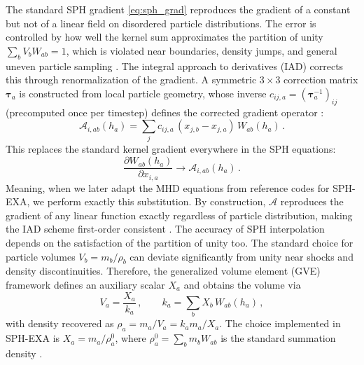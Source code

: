 The standard SPH gradient \eqref{eq:sph_grad} reproduces the gradient of a constant but not of a linear field on disordered particle distributions. The error is controlled by how well the kernel sum approximates the partition of unity $\sum_b V_b W_{ab} = 1$, which is violated near boundaries, density jumps, and general uneven particle sampling \cite{Cabezon2012}. The integral approach to derivatives (IAD) corrects this through renormalization of the gradient. A symmetric $3\times 3$ correction matrix $\boldsymbol{\tau}_a$ is constructed from local particle geometry, whose inverse $c_{ij,a} = (\boldsymbol{\tau}_a^{-1})_{ij}$ (precomputed once per timestep) defines the corrected gradient operator \cite{Cabezon2012, Cabezon2017}:
\begin{equation}
    \mathcal{A}_{i,ab}(h_a) = \sum_{j} c_{ij,a} \, (x_{j,b} - x_{j,a}) \, W_{ab}(h_a)\,.
    \label{eq:iad_grad}
\end{equation}
This replaces the standard kernel gradient everywhere in the SPH equations:
\begin{equation}
    \frac{\partial W_{ab}(h_a)}{\partial x_{i,a}} \longrightarrow \mathcal{A}_{i,ab}(h_a)\,.
    \label{eq:iad_replacement}
\end{equation}
Meaning, when we later adapt the MHD equations from reference codes for SPH-EXA, we perform exactly this substitution. By construction, $\mathcal{A}$ reproduces the gradient of any linear function exactly regardless of particle distribution, making the IAD scheme first-order consistent \cite{Cabezon2012}. %
The accuracy of SPH interpolation depends on the satisfaction of the partition of unity too. The standard choice for particle volumes $V_b = m_b/\rho_b$ can deviate significantly from unity near shocks and density discontinuities. Therefore, the generalized volume element (GVE) framework \cite{Cabezon2017, GarciaSenz2022} defines an auxiliary scalar $X_a$ and obtains the volume via
\begin{equation}
    V_a = \frac{X_a}{k_a}\,, \qquad k_a = \sum_b X_b \, W_{ab}(h_a)\,,
    \label{eq:gve}
\end{equation}
with density recovered as $\rho_a = m_a/V_a = k_a m_a/X_a$. The choice implemented in SPH-EXA is $X_a = m_a/\rho_a^0$, where $\rho_a^0 = \sum_b m_b W_{ab}$ is the standard summation density \cite{GarciaSenz2022}. %

